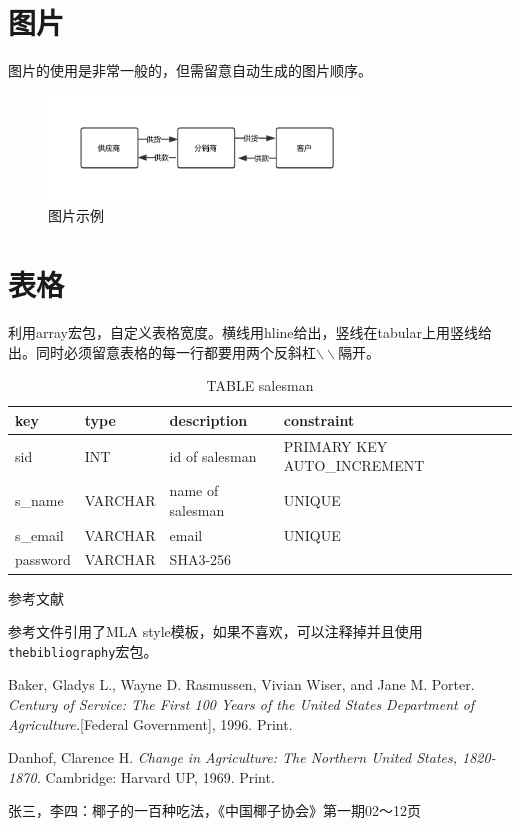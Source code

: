 \documentclass[10.5pt,a4paper,headings]{ctexart}
\newcommand{\bibent}{\noindent \hangindent 40pt}
\newenvironment{workscited}{\newpage \begin{center}参考文献
\end{center}}{\newpage }
\begin{document}
\section{图片}
图片的使用是非常一般的，但需留意自动生成的图片顺序。
\begin{figure}[htbp]
\centering
\includegraphics[page=1,width=0.75\textwidth]{f1.pdf}
\caption{图片示例}
\end{figure}

\section{表格}
利用array宏包，自定义表格宽度。横线用hline给出，竖线在tabular上用竖线给出。同时必须留意表格的每一行都要用两个反斜杠$\backslash\backslash$隔开。

\begin{table}
\centering
\begin{tabular}{ | p{1.5cm}<{\centering} | p{2cm}<{\centering} | p{3cm}<{\centering} | p{5cm}<{\centering} |}
\hline
key         & type      & description       & constraint \\
\hline
sid         & INT       & id of salesman    & PRIMARY KEY AUTO\_INCREMENT  \\
\hline
s\_name      & VARCHAR   & name of salesman  & UNIQUE  \\
\hline
s\_email     & VARCHAR   & email             & UNIQUE \\
\hline
password    & VARCHAR   & SHA3-256          & \\
\hline
\end{tabular}
\caption{TABLE salesman}
\end{table}

\begin{workscited}

\bibent
参考文件引用了MLA style模板，如果不喜欢，可以注释掉并且使用\texttt{thebibliography}宏包。

\bibent
Baker, Gladys L., Wayne D. Rasmussen, Vivian Wiser, and Jane M. Porter. \textit{Century of Service: The First 100 Years of the United States Department of Agriculture.}[Federal Government], 1996. Print.

\bibent
Danhof, Clarence H. \textit{Change in Agriculture: The Northern United States, 1820-1870.} Cambridge: Harvard UP, 1969. Print.

\bibent
张三，李四：椰子的一百种吃法，《中国椰子协会》第一期02～12页

\end{workscited}
\end{document}
